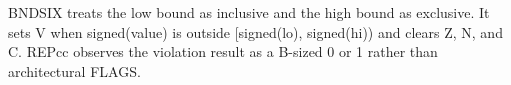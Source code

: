 BNDSIX treats the low bound as inclusive and the high bound as exclusive. It sets V when signed(value) is outside [signed(lo), signed(hi)) and clears Z, N, and C. REPcc observes the violation result as a B-sized 0 or 1 rather than architectural FLAGS.

